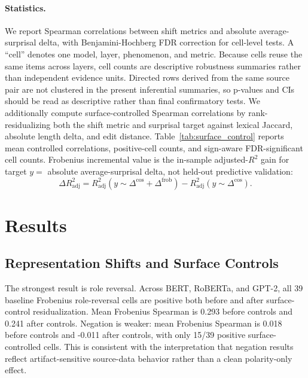 \documentclass{article}
\begin{document}
\paragraph{Statistics.}
We report Spearman correlations between shift metrics and absolute average-surprisal delta, with Benjamini-Hochberg FDR correction for cell-level tests. A ``cell'' denotes one model, layer, phenomenon, and metric. Because cells reuse the same items across layers, cell counts are descriptive robustness summaries rather than independent evidence units. Directed rows derived from the same source pair are not clustered in the present inferential summaries, so p-values and CIs should be read as descriptive rather than final confirmatory tests. We additionally compute surface-controlled Spearman correlations by rank-residualizing both the shift metric and surprisal target against lexical Jaccard, absolute length delta, and edit distance. Table~\ref{tab:surface_control} reports mean controlled correlations, positive-cell counts, and sign-aware FDR-significant cell counts. Frobenius incremental value is the in-sample adjusted-$R^2$ gain for target $y=$ absolute average-surprisal delta, not held-out predictive validation:
\begin{equation}
    \Delta R^2_{\mathrm{adj}} =
    R^2_{\mathrm{adj}}(y \sim \Delta^{\mathrm{cos}}+\Delta^{\mathrm{frob}})
    - R^2_{\mathrm{adj}}(y \sim \Delta^{\mathrm{cos}}).
\end{equation}

\section{Results}

\subsection{Representation Shifts and Surface Controls}

The strongest result is role reversal. Across BERT, RoBERTa, and GPT-2, all 39 baseline Frobenius role-reversal cells are positive both before and after surface-control residualization. Mean Frobenius Spearman is 0.293 before controls and 0.241 after controls. Negation is weaker: mean Frobenius Spearman is 0.018 before controls and -0.011 after controls, with only 15/39 positive surface-controlled cells. This is consistent with the interpretation that negation results reflect artifact-sensitive source-data behavior rather than a clean polarity-only effect.
\end{document}
